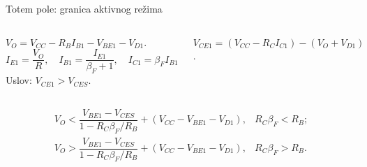 \begin{frame}[label=10-s062]{Totem pole: granica aktivnog režima}
\setlength{\abovedisplayskip}{4pt}\setlength{\belowdisplayskip}{4pt}\setlength{\abovedisplayshortskip}{3pt}\setlength{\belowdisplayshortskip}{3pt}
\begin{columns}[T,onlytextwidth]\centering \raggedright
$V_O=V_{CC}-R_BI_{B1}-V_{BE1}-V_{D1}$.
\[I_{E1}=\frac{V_O}R,\quad I_{B1}=\frac{I_{E1}}{\beta_F+1},\quad I_{C1}=\beta_FI_{B1}\]
Uslov: $V_{CE1}>V_{CES}$.\par
$V_{CE1}=(V_{CC}-R_CI_{C1})-(V_O+V_{D1})$.\end{columns}\medskip
\[\begin{array}{ll}V_O<\dfrac{V_{BE1}-V_{CES}}{1-R_C\beta_F/R_B}+(V_{CC}-V_{BE1}-V_{D1}),& R_C\beta_F<R_B;\\[8pt]
V_O>\dfrac{V_{BE1}-V_{CES}}{1-R_C\beta_F/R_B}+(V_{CC}-V_{BE1}-V_{D1}),& R_C\beta_F>R_B.
\end{array}\]
\end{frame}
